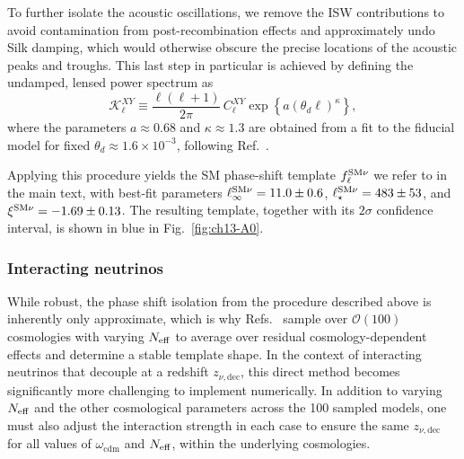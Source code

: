 \begin{subappendices}
To further isolate the acoustic oscillations, we remove the ISW contributions to avoid contamination from post-recombination effects and approximately undo
Silk damping, which would otherwise obscure the precise locations of the acoustic peaks and troughs. This last step in particular is achieved by defining the undamped, lensed power spectrum as~\cite{Follin:2015hya, Wallisch:2018rzj, Montefalcone:2025unv}
\begin{equation}
    \mathcal{K}_\ell^{XY} \equiv \frac{\ell(\ell+1)}{2\pi}\, C_\ell^{XY} \exp\left\{a(\theta_d\ell)^\kappa \right\},
    \label{eq:ch13-K_ell}
\end{equation}
where the parameters $a \approx 0.68$ and $\kappa \approx 1.3$ are obtained from a fit to the fiducial model for fixed $\theta_d \approx 1.6\times 10^{-3}$, following Ref.~\cite{Wallisch:2018rzj}.

Applying this procedure yields the SM phase-shift template $f^{\rm SM\nu}_\ell$ we refer to in the main text, with best-fit parameters $\ell^{\rm SM\nu}_\infty = 11.0 \pm 0.6$, $\ell^{\rm SM\nu}_\star = 483 \pm 53$, and $\xi^{\rm SM\nu} = -1.69 \pm 0.13$. The resulting template, together with its $2\sigma$ confidence interval, is shown in blue in Fig.~\ref{fig:ch13-A0}.


\subsubsection{Interacting neutrinos}

\noindent While robust, the phase shift isolation from the procedure described above is inherently only approximate, which is why Refs.~\cite{Follin:2015hya,Montefalcone:2025unv} sample over $\mathcal{O}(100)$ cosmologies with varying $N_\mathrm{eff}$ to average over residual cosmology-dependent effects and determine a stable template shape. In the context of interacting neutrinos that decouple at a redshift $z_{\nu, \mathrm{dec}}$, this direct method becomes significantly more challenging to implement numerically. In addition to varying $N_\mathrm{eff}$ and the other cosmological parameters across the 100 sampled models, one must also adjust the interaction strength in each case to ensure the same $z_{\nu, \mathrm{dec}}$ for all values of $\omega_{\mathrm{cdm}}$ and $N_\mathrm{eff}$, within the underlying cosmologies.


\end{subappendices}
